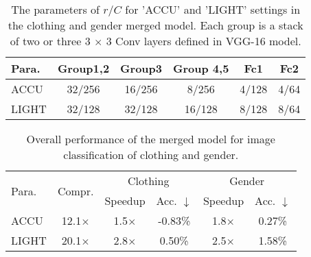 \documentclass{article}
\begin{document}
	
	
	
	
	
	
	\begin{table}[t]
		\centering
		\small
		\caption{The parameters of $r/C$ for 'ACCU' and 'LIGHT' settings in the clothing and gender merged model. Each group is a stack of two or three 3 $\times$ 3 Conv layers defined in VGG-16 model.  }
		\label{Experimenttwo_param}
		\begin{tabular}{lccccc}
			\toprule
			Para.       & Group1,2    & Group3   & Group 4,5  & Fc1    & Fc2             \\ \hline
			ACCU        & 32/256      & 16/256   & 8/256      & 4/128  & 4/64          \\
			LIGHT       & 32/128      & 32/128   & 16/128     & 8/128  & 8/64    \\
			\bottomrule
		\end{tabular}
	\end{table}
	
	
	\begin{table}[t]
		\centering
		\small
		\caption{Overall performance of the merged model for image classification of clothing and gender.}
		\label{TwoMerge}
		\begin{tabular}{lccccc}
			\toprule
			\multirow{2}{*}{Para.} & \multirow{2}{*}{Compr.} & \multicolumn{2}{c}{Clothing} & \multicolumn{2}{c}{Gender} \\
			&                              & Speedup      & Acc. $\downarrow$      & Speedup     & Acc. $\downarrow$     \\ \hline
			ACCU                      & 12.1$\times$                        & 1.5$\times$         & -0.83\%         & 1.8$\times$        & 0.27\%
			\\
			LIGHT                      & 20.1$\times$                        & 2.8$\times$         & 0.50\%         & 2.5$\times$         & 1.58\%          \\
			
			\bottomrule
		\end{tabular}
	\end{table}
	
\end{document}
